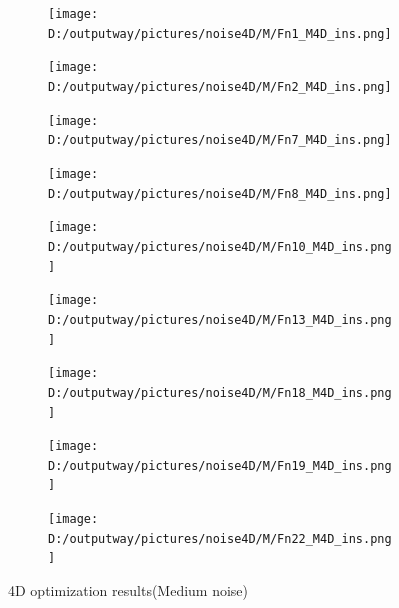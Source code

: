 \documentclass{article}
\begin{document}
\begin{figure}[H]
    \centering
    \begin{subfigure}[t]{.32\linewidth}
        \centering
        \texttt{[image: D:/outputway/pictures/noise4D/M/Fn1\_M4D\_ins.png]}
    \end{subfigure}
    \begin{subfigure}[t]{.32\linewidth}
        \centering
        \texttt{[image: D:/outputway/pictures/noise4D/M/Fn2\_M4D\_ins.png]}
    \end{subfigure}
    \begin{subfigure}[t]{.32\linewidth}
        \centering
        \texttt{[image: D:/outputway/pictures/noise4D/M/Fn7\_M4D\_ins.png]}
    \end{subfigure}
    \begin{subfigure}[t]{.32\linewidth}
        \centering
        \texttt{[image: D:/outputway/pictures/noise4D/M/Fn8\_M4D\_ins.png]}
    \end{subfigure}
    \begin{subfigure}[t]{.32\linewidth}
        \centering
        \texttt{[image: D:/outputway/pictures/noise4D/M/Fn10\_M4D\_ins.png]}
    \end{subfigure}
    \begin{subfigure}[t]{.32\linewidth}
        \centering
        \texttt{[image: D:/outputway/pictures/noise4D/M/Fn13\_M4D\_ins.png]}
    \end{subfigure}
    \begin{subfigure}[t]{.32\linewidth}
        \centering
        \texttt{[image: D:/outputway/pictures/noise4D/M/Fn18\_M4D\_ins.png]}
    \end{subfigure}
    \begin{subfigure}[t]{.32\linewidth}
        \centering
        \texttt{[image: D:/outputway/pictures/noise4D/M/Fn19\_M4D\_ins.png]}
    \end{subfigure}
    \begin{subfigure}[t]{.32\linewidth}
        \centering
        \texttt{[image: D:/outputway/pictures/noise4D/M/Fn22\_M4D\_ins.png]}
    \end{subfigure}
    \caption{4D optimization results(Medium noise)}
    \label{Fig8}
\end{figure}
\end{document}

